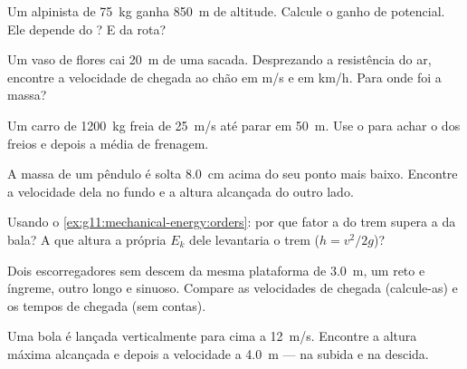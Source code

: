 \begin{exercise}[$\star$]\label{exo:g11:mechanical-energy:2}
Um alpinista de \qty{75}{kg} ganha \qty{850}{m} de altitude. Calcule o
ganho de  potencial. Ele depende do ? E da
rota?
\end{exercise}

\begin{exercise}[$\star$]\label{exo:g11:mechanical-energy:3}
Um vaso de flores cai \qty{20}{m} de uma sacada. Desprezando a
resistência do ar, encontre a velocidade de chegada ao chão em \unit{m/s}
e em \unit{km/h}. Para onde foi a massa?
\end{exercise}

\begin{exercise}[$\star$]\label{exo:g11:mechanical-energy:4}
Um carro de \qty{1200}{kg} freia de \qty{25}{m/s} até parar em
\qty{50}{m}. Use o  para achar o  dos
freios e depois a  média de frenagem.
\end{exercise}

\begin{exercise}[$\star$]\label{exo:g11:mechanical-energy:5}
A massa de um pêndulo é solta \qty{8.0}{cm} acima do seu ponto mais
baixo. Encontre a velocidade dela no fundo e a altura alcançada do outro
lado.
\end{exercise}

\begin{exercise}[$\star\star$]\label{exo:g11:mechanical-energy:6}
Usando o \cref{ex:g11:mechanical-energy:orders}: por que fator a  do trem supera a da bala? A que altura a própria $E_k$ dele
levantaria o trem ($h = v^2/2g$)?
\end{exercise}

\begin{exercise}[$\star\star$]\label{exo:g11:mechanical-energy:7}
Dois escorregadores sem  descem da mesma plataforma de
\qty{3.0}{m}, um reto e íngreme, outro longo e sinuoso. Compare as
velocidades de chegada (calcule-as) e os tempos de chegada (sem contas).
\end{exercise}

\begin{exercise}[$\star\star$]\label{exo:g11:mechanical-energy:8}
Uma bola é lançada verticalmente para cima a \qty{12}{m/s}. Encontre a
altura máxima alcançada e depois a velocidade a \qty{4.0}{m} --- na
subida e na descida.
\end{exercise}

